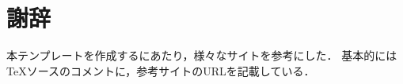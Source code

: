 \documentclass[../main/main]{subfiles}
\begin{document}
\chapter*{謝辞}
本テンプレートを作成するにあたり，様々なサイトを参考にした．
基本的にはTeXソースのコメントに，参考サイトのURLを記載している．

\vspace{5mm}
\rightline{\today}
\par
{}
\end{document}
